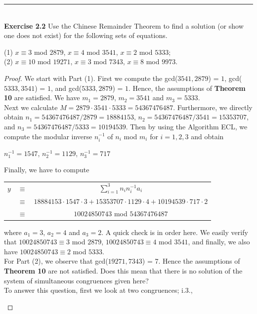 \documentclass[a4paper]{article}
\begin{document}
\noindent\rule{12cm}{0.4pt}\\
\noindent \textbf{Exercise 2.2} Use the Chinese Remainder Theorem to find a solution (or show one does not exist) for the following sets of equations.
\begin{center}
(1) $x \equiv 3$ mod $2879$, $x \equiv 4$ mod $3541$, $x \equiv 2$ mod $5333$;\\
(2) $x \equiv 10$ mod $19271$, $x \equiv 3$ mod $7343$, $x \equiv 8$ mod $9973$.
\end {center}
\begin{proof}
We start with Part (1). First we compute the gcd($3541,2879$) = $1$, gcd($5333, 3541$) = $1$, and gcd($5333, 2879$) = $1$. Hence, the assumptions of \textbf{Theorem 10} are satisfied. We have $m_{1} = 2879$, $m_{2} = 3541$ and $m_{3} = 5333$. \\
Next we calculate $M = 2879 \cdot 3541 \cdot 5333 = 54367476487$. Furthermore, we directly obtain $n_{1} = 54367476487 / 2879 = 18884153$, $n_{2} = 54367476487 / 3541 = 15353707$, and $n_{3} = 54367476487 / 5333 = 10194539$. Then by using the Algorithm ECL, we compute the modular inverse $n_{i}^{-1}$ of $n_{i}$ mod $m_{i}$ for $i = 1,2,3$ and obtain \\
\begin{center}
$n_{1}^{-1} = 1547$, $n_{2}^{-1} = 1129$, $n_{3}^{-1} = 717$
\end{center}
Finally, we have to compute
\begin{center}
\begin{tabular}{c c c}
$y$ & $\equiv$ & $\sum_{i=1}^{3}{n_{i}n_{i}^{-1}a_{i}}$ \\
& $\equiv$ & $18884153 \cdot 1547 \cdot 3 + 15353707 \cdot 1129 \cdot 4 + 10194539 \cdot 717 \cdot 2$ \\
& $\equiv$ & $10024850743$ mod $54367476487$
\end{tabular}
\end{center}
where $a_{1} = 3$, $a_{2} = 4$ and $a_{3} = 2$. A quick check is in order here. We easily verify that $10024850743 \equiv 3$ mod $2879$, $10024850743 \equiv 4$ mod $3541$, and finally, we also have $10024850743 \equiv 2$ mod $5333$. \\
For Part (2), we observe that gcd($19271, 7343$) = 7. Hence the assumptions of \textbf{Theorem 10} are not satisfied. Does this mean that there is no solution of the system of simultaneous congruences given here? \\
To answer this question, first we look at two congruences; i.3.,
\begin{center}

\end{center}
\end{proof}
\end{document}
